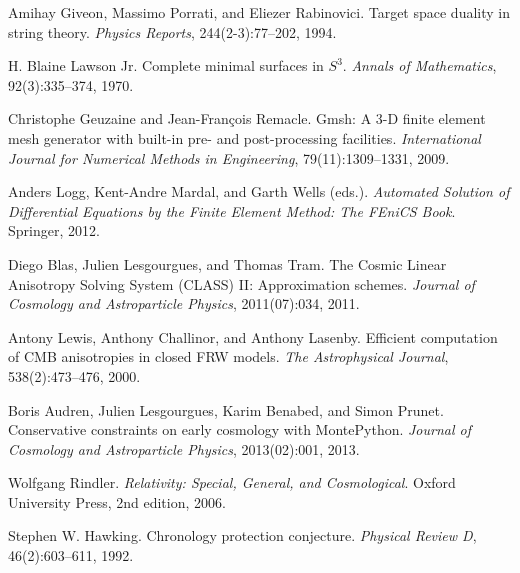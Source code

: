 \documentclass[12pt,a4paper]{article}
\theoremstyle{definition}
\begin{document}
\begin{thebibliography}{99}
Amihay Giveon, Massimo Porrati, and Eliezer Rabinovici.
Target space duality in string theory.
\emph{Physics Reports}, 244(2-3):77--202, 1994.

H. Blaine Lawson Jr.
Complete minimal surfaces in $S^3$.
\emph{Annals of Mathematics}, 92(3):335--374, 1970.

Christophe Geuzaine and Jean-Fran\c{c}ois Remacle.
Gmsh: A 3-D finite element mesh generator with built-in pre- and post-processing facilities.
\emph{International Journal for Numerical Methods in Engineering}, 79(11):1309--1331, 2009.

Anders Logg, Kent-Andre Mardal, and Garth Wells (eds.).
\emph{Automated Solution of Differential Equations by the Finite Element Method: The FEniCS Book}.
Springer, 2012.

Diego Blas, Julien Lesgourgues, and Thomas Tram.
The Cosmic Linear Anisotropy Solving System (CLASS) II: Approximation schemes.
\emph{Journal of Cosmology and Astroparticle Physics}, 2011(07):034, 2011.

Antony Lewis, Anthony Challinor, and Anthony Lasenby.
Efficient computation of CMB anisotropies in closed FRW models.
\emph{The Astrophysical Journal}, 538(2):473--476, 2000.

Boris Audren, Julien Lesgourgues, Karim Benabed, and Simon Prunet.
Conservative constraints on early cosmology with MontePython.
\emph{Journal of Cosmology and Astroparticle Physics}, 2013(02):001, 2013.

Wolfgang Rindler.
\emph{Relativity: Special, General, and Cosmological}.
Oxford University Press, 2nd edition, 2006.

Stephen W. Hawking.
Chronology protection conjecture.
\emph{Physical Review D}, 46(2):603--611, 1992.

\end{thebibliography}
\end{document}
